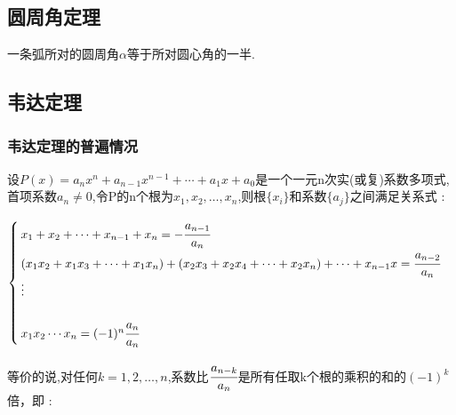 \documentclass[UTF8,12pt]{ctexbook}
\newcommand{\tikzPlaceDot}[1]{\draw[fill = black] #1 circle (1pt)}
\begin{document}
{{{}%

\subsection{圆周角定理}{
  一条弧所对的圆周角$\alpha$等于所对圆心角的一半.


}%

\subsection{韦达定理}{
\subsubsection{韦达定理的普遍情况}{
设$P(x) = a_nx^n + a_{n-1}x^{n-1} + \dotsm + a_1x + a_0$是一个一元n次实(或复)系数多项式,首项系数$a_n \neq 0$,令P的n个根为$x_1,x_2,\dots,x_n$,则根$\{x_i\}$和系数$\{a_j\}$之间满足关系式 :

$$
  \begin{cases}
    x_1 + x_2 + \dotsm + x_{n-1} + x_n = -\cfrac{a_{n-1}}{a_n}                                                           \\
    (x_1x_2 + x_1x_3 + \dotsm + x_1x_n) + (x_2x_3 + x_2x_4 + \dotsm + x_2x_n) + \dotsm + x_{n-1}x = \cfrac{a_{n-2}}{a_n} \\
    \vdots                                                                                                               \\                                                                                                               \\
    x_1x_2 \dotsm x_n = (-1)^n\cfrac{a_n}{a_n}
  \end{cases}
$$

等价的说,对任何$k = 1,2,\dots,n$,系数比$\cfrac{a_{n-k}}{a_n}$是所有任取k个根的乘积的和的$(-1)^k$倍，即 :

}}}}
\end{document}

